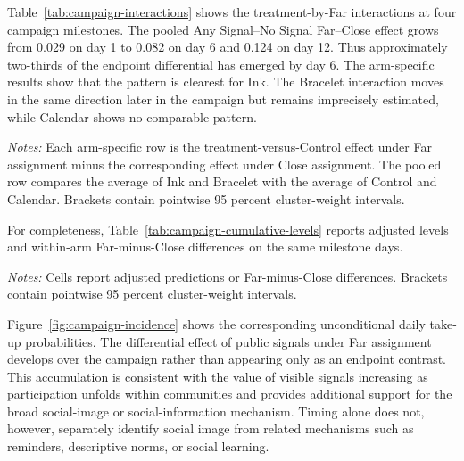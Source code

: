 \documentclass[12pt]{article}
\begin{document}
Table~\ref{tab:campaign-interactions} shows the treatment-by-Far interactions
at four campaign milestones. The pooled Any Signal--No Signal Far--Close effect
grows from 0.029 on day 1 to 0.082 on day 6 and 0.124 on day 12. Thus approximately
two-thirds of the endpoint differential has emerged by day 6. The arm-specific
results show that the pattern is clearest for Ink. The Bracelet interaction moves
in the same direction later in the campaign but remains imprecisely estimated,
while Calendar shows no comparable pattern.

\begin{table}[htbp]
  \centering
  \small
  \caption{Evolution of treatment-by-Far interaction effects}
  \label{tab:campaign-interactions}
  \resizebox{\linewidth}{!}{%
    }
  \begin{minipage}{0.94\linewidth}
    \vspace{0.3em}\footnotesize
    \textit{Notes:} Each arm-specific row is the treatment-versus-Control effect
    under Far assignment minus the corresponding effect under Close assignment.
    The pooled row compares the average of Ink and Bracelet with the average of
    Control and Calendar. Brackets contain pointwise 95 percent cluster-weight
    intervals.
  \end{minipage}
\end{table}

For completeness, Table~\ref{tab:campaign-cumulative-levels} reports adjusted
levels and within-arm Far-minus-Close differences on the same milestone days.

\begin{table}[htbp]
  \centering
  \small
  \caption{Adjusted cumulative take-up on selected campaign days}
  \label{tab:campaign-cumulative-levels}
  \resizebox{\linewidth}{!}{%
    }
  \begin{minipage}{0.94\linewidth}
    \vspace{0.3em}\footnotesize
    \textit{Notes:} Cells report adjusted predictions or Far-minus-Close
    differences. Brackets contain pointwise 95 percent cluster-weight intervals.
  \end{minipage}
\end{table}

Figure~\ref{fig:campaign-incidence} shows the corresponding unconditional daily
take-up probabilities. The differential effect of public signals under Far
assignment develops over the campaign rather than appearing only as an endpoint
contrast. This accumulation is consistent with the value of visible signals
increasing as participation unfolds within communities and provides additional
support for the broad social-image or social-information mechanism. Timing alone
does not, however, separately identify social image from related mechanisms such
as reminders, descriptive norms, or social learning.
\end{document}
